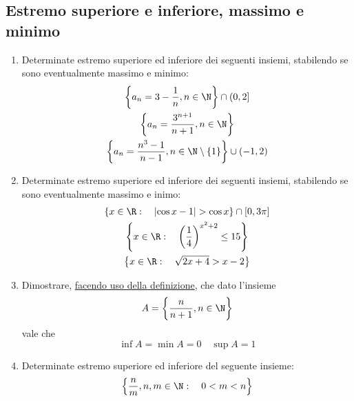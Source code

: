 \subsection{Estremo superiore e inferiore, massimo e minimo}
\begin{enumerate}
	\item Determinate estremo superiore ed inferiore dei seguenti insiemi, stabilendo se sono eventualmente massimo e minimo:
	      \begin{gather*}
		      \left\{a_n = 3 - \frac{1}{n}, n \in  \N \right\} \cap  \left(0,2\right]\\
		      \left\{a_n = \frac{3^{n+1}}{n+1}, n \in  \N \right\}\\
		      \left\{a_n = \frac{n^3  -1}{n-1}, n \in  \N  \setminus \left\{1\right\}\right\} \cup \left(-1,2\right)
	      \end{gather*}
	\item Determinate estremo superiore ed inferiore dei seguenti insiemi, stabilendo se sono eventualmente massimo e inimo:
	      \begin{gather*}
		      \left\{x \in  \R  : \quad \left| \cos x -1 \right| > \cos x\right\} \cap  \left[0,3 \pi \right]\\
		      \left\{x \in  \R  : \quad \left(\frac{1}{4}\right)^{x^2  +2} \le  15\right\}   \\
		      \left\{x \in  \R  : \quad \sqrt{2x + 4}> x-2\right\}
	      \end{gather*}
	\item Dimostrare, \underline{facendo uso della definizione}, che dato l'insieme
	      \[
		      A = \left\{\frac{n}{n+1}, n \in  \N \right\}
	      \]
	      vale che
	      \[
		      \operatorname{inf}A = \operatorname{min}A = 0 \quad \operatorname{sup}A = 1
	      \]
	\item Determinate estremo superiore ed inferiore del seguente insieme:
	      \[
		      \left\{\frac{n}{m}, n,m \in  \N : \quad 0 < m<n\right\}
	      \]
\end{enumerate}
